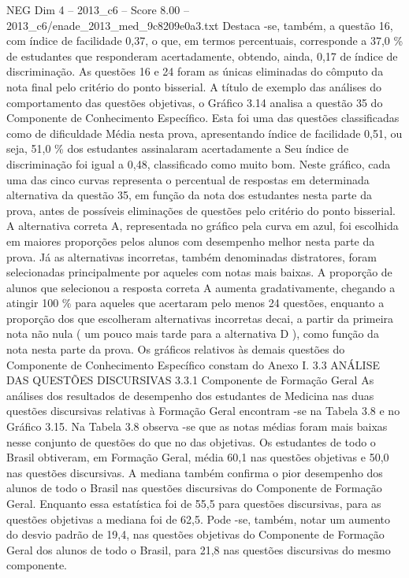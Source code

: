 \begin{textsample}{NEG Dim 4 – 2013\_c6 – Score 8.00 – 2013\_c6/enade\_2013\_med\_9c8209e0a3.txt}
Destaca -se, também, a questão 16, com índice de facilidade 0,37, o que, em termos percentuais, corresponde a 37,0 \% de estudantes que responderam acertadamente, obtendo, ainda, 0,17 de índice de discriminação.
As questões 16 e 24 foram as únicas eliminadas do cômputo da nota final pelo critério do ponto bisserial.
A título de exemplo das análises do comportamento das questões objetivas, o Gráfico 3.14 analisa a questão 35 do Componente de Conhecimento Específico.
Esta foi uma das questões classificadas como de dificuldade Média nesta prova, apresentando índice de facilidade 0,51, ou seja, 51,0 \% dos estudantes assinalaram acertadamente a Seu índice de discriminação foi igual a 0,48, classificado como muito bom.
Neste gráfico, cada uma das cinco curvas representa o percentual de respostas em determinada alternativa da questão 35, em função da nota dos estudantes nesta parte da prova, antes de possíveis eliminações de questões pelo critério do ponto bisserial.
A alternativa correta A, representada no gráfico pela curva em azul, foi escolhida em maiores proporções pelos alunos com desempenho melhor nesta parte da prova.
Já as alternativas incorretas, também denominadas distratores, foram selecionadas principalmente por aqueles com notas mais baixas.
A proporção de alunos que selecionou a resposta correta A aumenta gradativamente, chegando a atingir 100 \% para aqueles que acertaram pelo menos 24 questões, enquanto a proporção dos que escolheram alternativas incorretas decai, a partir da primeira nota não nula ( um pouco mais tarde para a alternativa D ), como função da nota nesta parte da prova.
Os gráficos relativos às demais questões do Componente de Conhecimento Específico constam do Anexo I. 3.3 ANÁLISE DAS QUESTÕES DISCURSIVAS 3.3.1 Componente de Formação Geral As análises dos resultados de desempenho dos estudantes de Medicina nas duas questões discursivas relativas à Formação Geral encontram -se na Tabela 3.8 e no Gráfico 3.15.
Na Tabela 3.8 observa -se que as notas médias foram mais baixas nesse conjunto de questões do que no das objetivas.
Os estudantes de todo o Brasil obtiveram, em Formação Geral, média 60,1 nas questões objetivas e 50,0 nas questões discursivas.
A mediana também confirma o pior desempenho dos alunos de todo o Brasil nas questões discursivas do Componente de Formação Geral.
Enquanto essa estatística foi de 55,5 para questões discursivas, para as questões objetivas a mediana foi de 62,5.
Pode -se, também, notar um aumento do desvio padrão de 19,4, nas questões objetivas do Componente de Formação Geral dos alunos de todo o Brasil, para 21,8 nas questões discursivas do mesmo componente.

\end{textsample}
